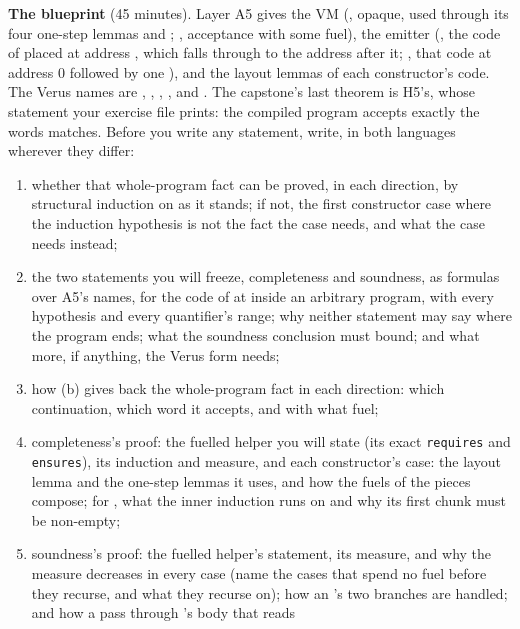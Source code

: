 \documentclass[11pt]{article}
\begin{document}
\begin{problem}\label{prob:B1}
\textbf{The blueprint} (45 minutes). Layer A5 gives the VM (,
opaque, used through its four one-step lemmas and ;
, acceptance with some fuel), the emitter (,
the code of  placed at address , which falls through to the
address after it; , that code at address 0 followed by one
),  and the layout lemmas of each constructor's code.
The Verus names are , , ,
,  and . The capstone's last theorem is H5's,
whose statement your exercise file prints: the compiled program accepts
exactly the words  matches. Before you write any statement, write, in
both languages wherever they differ:
\begin{enumerate}
\item[(a)] whether that whole-program fact can be proved, in each direction,
  by structural induction on  as it stands; if not, the first
  constructor case where the induction hypothesis is not the fact the case
  needs, and what the case needs instead;
\item[(b)] the two statements you will freeze, completeness and soundness, as
  formulas over A5's names, for the code of  at  inside an
  arbitrary program, with every hypothesis and every quantifier's range; why
  neither statement may say where the program ends; what the soundness
  conclusion must bound; and what more, if anything, the Verus form needs;
\item[(c)] how (b) gives back the whole-program fact in each direction: which
  continuation, which word it accepts, and with what fuel;
\item[(d)] completeness's proof: the fuelled helper you will state (its exact
  \texttt{requires} and \texttt{ensures}), its induction and measure, and each
  constructor's case: the layout lemma and the one-step lemmas it uses, and how
  the fuels of the pieces compose; for , what the inner induction
  runs on and why its first chunk must be non-empty;
\item[(e)] soundness's proof: the fuelled helper's statement, its measure,
  and why the measure decreases in every case (name the cases that spend no
  fuel before they recurse, and what they recurse on); how an 's two
  branches are handled; and how a pass through 's body that reads

\end{enumerate}
\end{problem}
\end{document}
